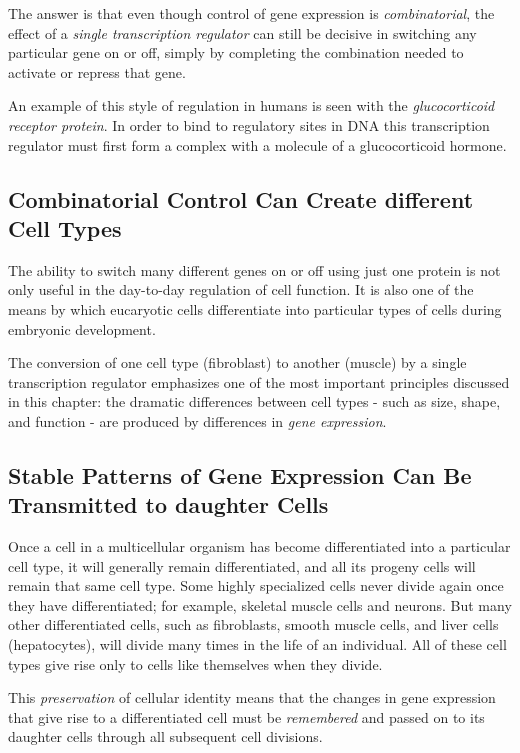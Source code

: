 The answer is that even though
control of gene expression is \textit{combinatorial}, the effect of a \textit{single transcription
regulator} can still be decisive in switching any particular gene
on or off, simply by completing the combination needed to activate or
repress that gene.

An example of this style of regulation in humans is seen with the \textit{glucocorticoid
receptor protein}. In order to bind to regulatory sites in DNA
this transcription regulator must first form a complex with a molecule
of a glucocorticoid hormone.

\subsection{Combinatorial Control Can Create different Cell Types}

The ability to switch many different genes on or off using just one protein
is not only useful in the day-to-day regulation of cell function. It is also
one of the means by which eucaryotic cells differentiate into particular
types of cells during embryonic development.

The conversion of one cell type (fibroblast) to another (muscle) by a single
transcription regulator emphasizes one of the most important principles
discussed in this chapter: the dramatic differences between cell types -
such as size, shape, and function - are produced by differences in \textit{gene
expression}.

\subsection{Stable Patterns of Gene Expression Can Be Transmitted to daughter Cells}

Once a cell in a multicellular organism has become differentiated into a particular cell type, it will generally
remain differentiated, and all its progeny cells will remain that same cell
type. Some highly specialized cells never divide again once they have
differentiated; for example, skeletal muscle cells and neurons. But many
other differentiated cells, such as fibroblasts, smooth muscle cells, and
liver cells (hepatocytes), will divide many times in the life of an individual.
All of these cell types give rise only to cells like themselves when
they divide.

This \textit{preservation} of cellular identity means that the changes in gene
expression that give rise to a differentiated cell must be \textit{remembered} and
passed on to its daughter cells through all subsequent cell divisions.


